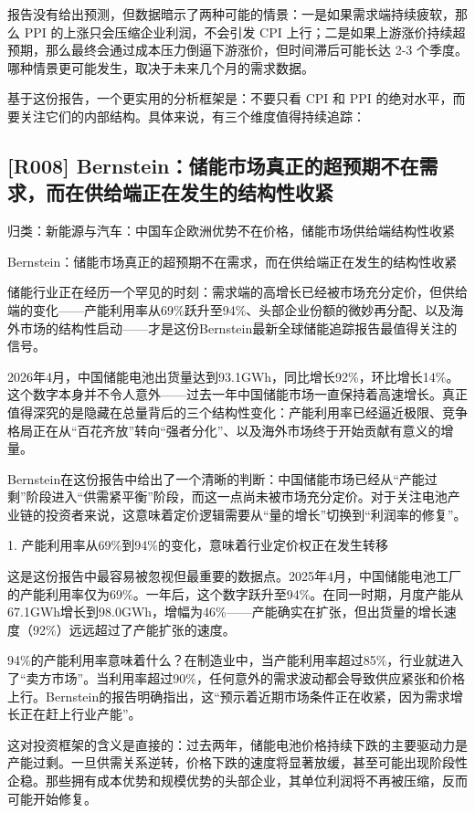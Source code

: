 \documentclass[11pt]{ctexart}
\begin{document}
报告没有给出预测，但数据暗示了两种可能的情景：一是如果需求端持续疲软，那么 PPI 的上涨只会压缩企业利润，不会引发 CPI 上行；二是如果上游涨价持续超预期，那么最终会通过成本压力倒逼下游涨价，但时间滞后可能长达 2-3 个季度。哪种情景更可能发生，取决于未来几个月的需求数据。

基于这份报告，一个更实用的分析框架是：不要只看 CPI 和 PPI 的绝对水平，而要关注它们的内部结构。具体来说，有三个维度值得持续追踪：

\subsection{[R008] Bernstein：储能市场真正的超预期不在需求，而在供给端正在发生的结构性收紧}
{\small\color{refgray}归类：新能源与汽车：中国车企欧洲优势不在价格，储能市场供给端结构性收紧}

Bernstein：储能市场真正的超预期不在需求，而在供给端正在发生的结构性收紧

储能行业正在经历一个罕见的时刻：需求端的高增长已经被市场充分定价，但供给端的变化——产能利用率从69\%跃升至94\%、头部企业份额的微妙再分配、以及海外市场的结构性启动——才是这份Bernstein最新全球储能追踪报告最值得关注的信号。

2026年4月，中国储能电池出货量达到93.1GWh，同比增长92\%，环比增长14\%。这个数字本身并不令人意外——过去一年中国储能市场一直保持着高速增长。真正值得深究的是隐藏在总量背后的三个结构性变化：产能利用率已经逼近极限、竞争格局正在从“百花齐放”转向“强者分化”、以及海外市场终于开始贡献有意义的增量。

Bernstein在这份报告中给出了一个清晰的判断：中国储能市场已经从“产能过剩”阶段进入“供需紧平衡”阶段，而这一点尚未被市场充分定价。对于关注电池产业链的投资者来说，这意味着定价逻辑需要从“量的增长”切换到“利润率的修复”。

1. 产能利用率从69\%到94\%的变化，意味着行业定价权正在发生转移

这是这份报告中最容易被忽视但最重要的数据点。2025年4月，中国储能电池工厂的产能利用率仅为69\%。一年后，这个数字跃升至94\%。在同一时期，月度产能从67.1GWh增长到98.0GWh，增幅为46\%——产能确实在扩张，但出货量的增长速度（92\%）远远超过了产能扩张的速度。

94\%的产能利用率意味着什么？在制造业中，当产能利用率超过85\%，行业就进入了“卖方市场”。当利用率超过90\%，任何意外的需求波动都会导致供应紧张和价格上行。Bernstein的报告明确指出，这“预示着近期市场条件正在收紧，因为需求增长正在赶上行业产能”。

这对投资框架的含义是直接的：过去两年，储能电池价格持续下跌的主要驱动力是产能过剩。一旦供需关系逆转，价格下跌的速度将显著放缓，甚至可能出现阶段性企稳。那些拥有成本优势和规模优势的头部企业，其单位利润将不再被压缩，反而可能开始修复。
\end{document}
